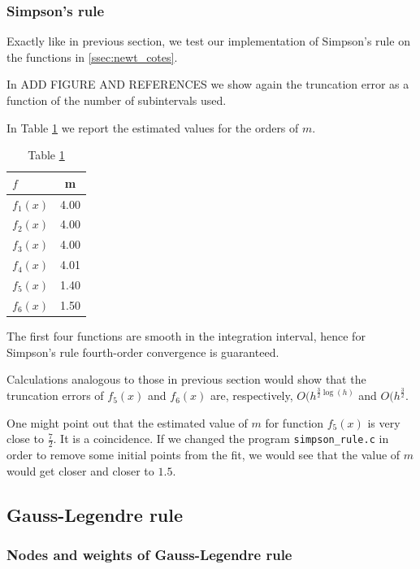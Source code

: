 \documentclass[a4paper,11]{article}
\newcommand{\mdcode}[1]{\lstinline[backgroundcolor=\color{gray!10}, frame=single, frameround=tttt]|#1|}
\begin{document}
\subsubsection{Simpson's rule}

Exactly like in previous section, we test our implementation of Simpson's rule
on the functions in \ref{ssec:newt_cotes}.

In ADD FIGURE AND REFERENCES we show again the truncation error as a function
of the number of subintervals used.

In Table \ref{table:simp_rule_conv_data} we report the estimated values for 
the orders of $m$.

\begin{table}[ht]
	\centering
	\begin{tabular}{l|c}
		$f$ & m \\
		\hline
		$f_{1}(x)$ & 4.00\\
		$f_{2}(x)$ & 4.00\\
		$f_{3}(x)$ & 4.00\\
		$f_{4}(x)$ & 4.01\\
		$f_{5}(x)$ & 1.40\\
		$f_{6}(x)$ & 1.50\\
	\end{tabular}
	\caption{Table \ref{table:simp_rule_conv_data}}
	\label{table:simp_rule_conv_data}
\end{table}

The first four functions are smooth in the integration interval, hence
for Simpson's rule fourth-order convergence is guaranteed.

Calculations analogous to those in previous section would show that the 
truncation errors of $f_{5}(x)$ and $f_{6}(x)$ are, respectively,
$O(h^{\frac{3}{2}\log(h)}$ and $O(h^{\frac{3}{2}}$.

One might point out that the estimated value of $m$ for function $f_{5}(x)$
is very close to $\frac{7}{2}$. It is a coincidence. If we changed the program
\mdcode{simpson_rule.c} in order to remove some initial points from the fit, 
we would see that the value of $m$ would get closer and closer to $1.5$.

\subsection{Gauss-Legendre rule}


\subsubsection{Nodes and weights of Gauss-Legendre rule}
\end{document}

